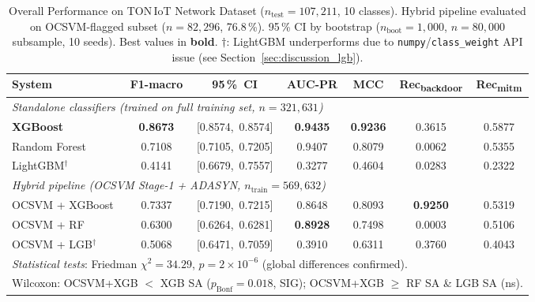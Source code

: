 \begin{table}[!t]
\renewcommand{\arraystretch}{1.2}
\caption{Overall Performance on TON\,IoT Network Dataset ($n_{\text{test}}=107{,}211$, 10 classes).
Hybrid pipeline evaluated on OCSVM-flagged subset ($n=82{,}296$, 76.8\,\%).
95\,\% CI by bootstrap ($n_{\text{boot}}=1{,}000$, $n=80{,}000$ subsample, 10 seeds).
Best values in \textbf{bold}. $\dagger$: LightGBM underperforms due to
\texttt{numpy}/\texttt{class\_weight} API issue (see Section~\ref{sec:discussion_lgb}).}
\label{tab:stage2_main}
\centering
\footnotesize
\begin{tabular}{lcccccc}
\toprule
\textbf{System} & \textbf{F1-macro} & \textbf{95\,\%~CI} & \textbf{AUC-PR} &
\textbf{MCC} & \textbf{Rec\textsubscript{backdoor}} & \textbf{Rec\textsubscript{mitm}} \\
\midrule
\multicolumn{7}{l}{\textit{Standalone classifiers (trained on full training set, $n=321{,}631$)}} \\
\quad \textbf{XGBoost}       & \textbf{0.8673} & [0.8574,~0.8574] & \textbf{0.9435} & \textbf{0.9236} & 0.3615 & 0.5877 \\
\quad Random Forest           & 0.7108          & [0.7105,~0.7205] & 0.9407          & 0.8079          & 0.0062 & 0.5355 \\
\quad LightGBM$^\dagger$      & 0.4141          & [0.6679,~0.7557] & 0.3277          & 0.4604          & 0.0283 & 0.2322 \\
\midrule
\multicolumn{7}{l}{\textit{Hybrid pipeline (OCSVM Stage-1 + ADASYN, $n_{\text{train}}=569{,}632$)}} \\
\quad OCSVM + XGBoost         & 0.7337 & [0.7190,~0.7215] & 0.8648 & 0.8093 & \textbf{0.9250} & 0.5319 \\
\quad OCSVM + RF              & 0.6300 & [0.6264,~0.6281] & \textbf{0.8928} & 0.7498 & 0.0003 & 0.5106 \\
\quad OCSVM + LGB$^\dagger$   & 0.5068 & [0.6471,~0.7059] & 0.3910 & 0.6311 & 0.3760 & 0.4043 \\
\midrule
\multicolumn{7}{l}{%
\textit{Statistical tests}: Friedman $\chi^2=34.29$, $p=2{\times}10^{-6}$ (global differences confirmed).} \\
\multicolumn{7}{l}{%
Wilcoxon: OCSVM+XGB $<$ XGB SA ($p_{\text{Bonf}}=0.018$, SIG); OCSVM+XGB $\geq$ RF SA \& LGB SA (ns).} \\
\bottomrule
\end{tabular}
\end{table}
